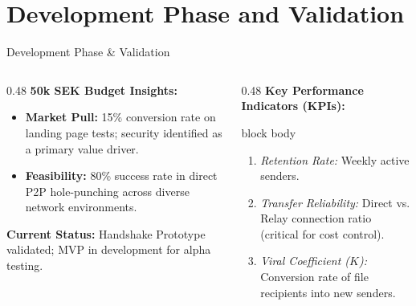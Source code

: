 \documentclass[aspectratio=169]{beamer}
\begin{document}
\section{Development Phase and Validation}
\begin{frame}{Development Phase \& Validation}
    \begin{columns}[t]
        \begin{column}{0.48\textwidth}
            \textbf{50k SEK Budget Insights:}
            \vspace{0.2cm}
            \begin{itemize}
                \small
                \item \textbf{Market Pull:} 15\% conversion rate on landing page tests; security identified as a primary value driver.
                \item \textbf{Feasibility:} 80\% success rate in direct P2P hole-punching across diverse network environments.
            \end{itemize}
            \vspace{0.2cm}
            \small \textbf{Current Status:} Handshake Prototype validated; MVP in development for alpha testing.
        \end{column}

        \begin{column}{0.48\textwidth}
            \textbf{Key Performance Indicators (KPIs):}
            \vspace{0.2cm}
            \begin{beamercolorbox}[rounded=true,sep=0.25cm]{block body}
                \small
                \begin{enumerate}
                    \item \textit{Retention Rate:} Weekly active senders.
                    \item \textit{Transfer Reliability:} Direct vs. Relay connection ratio (critical for cost control).
                    \item \textit{Viral Coefficient ($K$):} Conversion rate of file recipients into new senders.
                \end{enumerate}
            \end{beamercolorbox}
        \end{column}
    \end{columns}
\end{frame}

\end{document}
